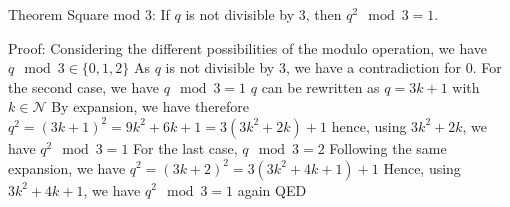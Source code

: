 Theorem Square mod 3:
If $q$ is not divisible by $3$, then $q^2 \mod 3 = 1$.


Proof:
Considering the different possibilities of the modulo operation, we have $q \mod 3 \in \{ 0, 1, 2 \}$
As $q$ is not divisible by $3$, we have a contradiction for $0$.
For the second case, we have $q \mod 3 = 1$
    $q$ can be rewritten as $q = 3k + 1$ with $k \in \mathcal{N}$
    By expansion, we have therefore $q^2 = (3k+1)^2 = 9k^2+6k+1 = 3(3k^2 + 2k) + 1$
    hence, using $3k^2 + 2k$, we have $q^2 \mod 3 = 1$
For the last case, $q \mod 3 = 2$
    Following the same expansion, we have $q^2 = (3k+2)^2 = 3(3k^2+4k+1) +1$
    Hence, using $3k^2 + 4k + 1$, we have $q^2 \mod 3 = 1$ again
QED